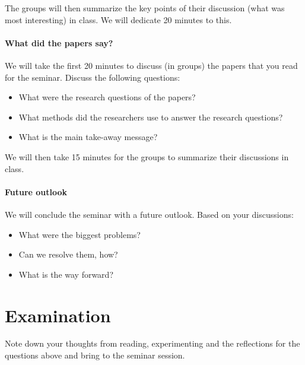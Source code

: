 The groups will then summarize the key points of their discussion (\eg what was 
most interesting) in class.
We will dedicate 20 minutes to this.

\paragraph{What did the papers say?}

We will take the first 20 minutes to discuss (in groups) the papers that you 
read for the seminar.
Discuss the following questions:
\begin{itemize}
  \item What were the research questions of the papers?
  \item What methods did the researchers use to answer the research questions?
  \item What is the main take-away message?
\end{itemize}

We will then take 15 minutes for the groups to summarize their discussions in 
class.

\paragraph{Future outlook}

We will conclude the seminar with a future outlook.
Based on your discussions:
\begin{itemize}
  \item What were the biggest problems?
  \item Can we resolve them, how?
  \item What is the way forward?
\end{itemize}


\section{Examination}

Note down your thoughts from reading, experimenting and the reflections for the 
questions above and bring to the seminar session.


\printbibliography
